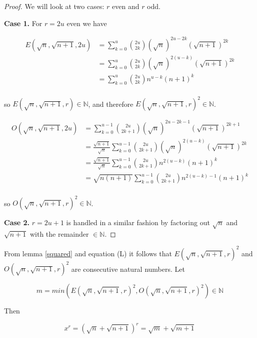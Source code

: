 \begin{proof}

\noindent We will look at two cases: $r$ even and $r$ odd.

\noindent \textbf{Case 1.} For $r = 2 u$ even we have

\begin{align*}
E(\sqrt{n}, \sqrt{n + 1}, 2 u) &=  \sum_{k = 0}^u  \binom{2 u}{2 k} (\sqrt{n})^{2 u - 2 k} (\sqrt{n + 1})^{2 k} \\
&=  \sum_{k = 0}^u  \binom{2 u}{2 k} (\sqrt{n})^{2 (u - k)} (\sqrt{n + 1})^{2 k} \\
&=  \sum_{k = 0}^u  \binom{2 u}{2 k} n^{u - k} (n + 1)^k \\
\end{align*}

\noindent so $E(\sqrt{n}, \sqrt{n + 1}, r) \in \mathbb{N}$, and therefore $E(\sqrt{n}, \sqrt{n + 1}, r)^2 \in \mathbb{N}$.

\begin{align*}
O(\sqrt{n}, \sqrt{n + 1}, 2 u) &=  \sum_{k = 0}^{u - 1}  \binom{2 u}{2 k + 1} (\sqrt{n})^{2 u - 2 k - 1} (\sqrt{n + 1})^{2 k + 1} \\
&=  \frac{\sqrt{n + 1}}{\sqrt{n}} \sum_{k = 0}^{u - 1}  \binom{2 u}{2 k + 1} (\sqrt{n})^{2 (u - k)} (\sqrt{n + 1})^{2 k} \\
&=  \frac{\sqrt{n + 1}}{\sqrt{n}} \sum_{k = 0}^{u - 1}  \binom{2 u}{2 k + 1} n^{2 (u - k)} (n + 1)^{k} \\
&=  \sqrt{n (n + 1)} \sum_{k = 0}^{u - 1}  \binom{2 u}{2 k + 1} n^{2 (u - k) - 1} (n + 1)^{k} \\
\end{align*}

\noindent so $O(\sqrt{n}, \sqrt{n + 1}, r)^2 \in \mathbb{N}$.

\noindent \textbf{Case 2.}  $r = 2 u + 1$ is handled in a similar fashion by factoring out $\sqrt{n}$ and $\sqrt{n + 1}$ with the remainder $\in \mathbb{N}$.

\end{proof}

\noindent From lemma \ref{squared} and equation (L) it follows that  $E(\sqrt{n}, \sqrt{n + 1}, r)^2$ and $O(\sqrt{n}, \sqrt{n + 1}, r)^2$ are consecutive natural numbers. Let

\begin{equation*}
m = min(E(\sqrt{n}, \sqrt{n + 1}, r)^2, O(\sqrt{n}, \sqrt{n + 1}, r)^2) \in \mathbb{N}
\end{equation*}

\noindent Then

\begin{equation*}
x^r = (\sqrt{n} + \sqrt{n + 1})^r = \sqrt{m} + \sqrt{m + 1}
\end{equation*}



